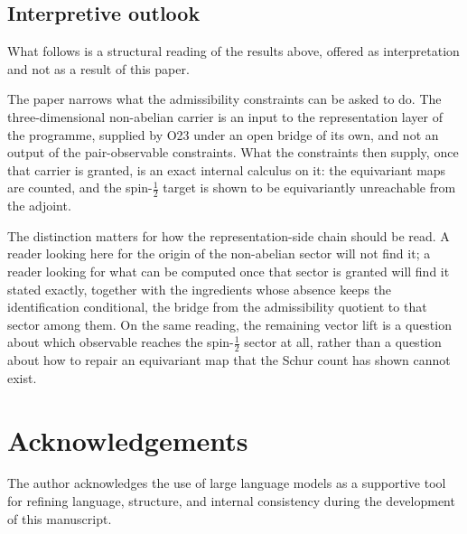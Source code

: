 \documentclass[11pt,a4paper]{article}
\theoremstyle{remark}
\begin{document}
  \subsection*{Interpretive outlook}

  What follows is a structural reading of the results above, offered as interpretation and not as a
  result of this paper.

  The paper narrows what the admissibility constraints can be asked to do.
  The three-dimensional non-abelian carrier is an input to the representation layer of the
  programme, supplied by O23 under an open bridge of its own, and not an output of the
  pair-observable constraints.
  What the constraints then supply, once that carrier is granted, is an exact internal calculus on
  it: the equivariant maps are counted, and the spin-$\tfrac{1}{2}$ target is shown to be
  equivariantly unreachable from the adjoint.

  The distinction matters for how the representation-side chain should be read.
  A reader looking here for the origin of the non-abelian sector will not find it; a reader looking
  for what can be computed once that sector is granted will find it stated exactly, together with
  the ingredients whose absence keeps the identification conditional, the bridge from the
  admissibility quotient to that sector among them.
  On the same reading, the remaining vector lift is a question about which observable reaches the
  spin-$\tfrac{1}{2}$ sector at all, rather than a question about how to repair an equivariant map
  that the Schur count has shown cannot exist.

  \section*{Acknowledgements}
  The author acknowledges the use of large language models as a supportive tool for refining
  language, structure, and internal consistency during the development of this manuscript.

  
  
\end{document}
